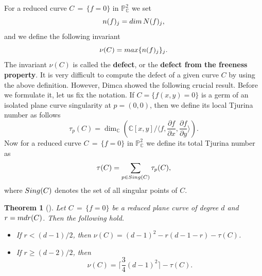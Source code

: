 \documentclass[12pt]{article}
\theoremstyle{plain}
\newtheorem{theorem}[thm]{Theorem}
\theoremstyle{definition}
\begin{document}
For a reduced curve $C \, = \, \{ f=0 \}$ in $\mathbb{P}^{2}_{\mathbb{C}}$ we set 
$$n(f)_{j} = {\rm dim} \, N(f)_{j},$$ and we define the following invariant
$$\nu(C) = {\rm max}\{n(f)_{j}\}_{j}.$$
The invariant $\nu(C)$ is called the \textbf{defect}, or the \textbf{defect from the freeness property}. It is very difficult to compute the defect of a given curve $C$ by using the above definition. However, Dimca showed the following crucial result. Before we formulate it, let us fix the notation. If $C=\{f(x,y)=0\}$ is a germ of an isolated plane curve singularity at $p=(0,0)$, then we define its local Tjurina number as follows 
$$\tau_{p}(C)=\dim_\mathbb{C}\left(\mathbb{C}[x,y] /\bigg\langle f,\frac{\partial f}{\partial x},\frac{\partial f}{\partial y}\bigg\rangle \right).$$  
Now for a reduced curve $C \, = \, \{ f=0 \}$ in $\mathbb{P}^{2}_{\mathbb{C}}$ we define its total Tjurina number as
$$\tau(C) = \sum_{p \in {\rm Sing}(C)} \tau_{p}(C),$$
where ${\rm Sing}(C)$ denotes the set of all singular points of $C$.
\begin{theorem}[{\cite[Theorem 1.2]{Dimca1}}]
\label{deff}
Let $C \, = \, \{ f=0 \}$ be a reduced plane curve of degree $d$ and $r= {\rm mdr}(C)$. Then the following hold.
\begin{itemize}
    \item If $r < (d-1)/2$, then $\nu(C) = (d-1)^{2}-r(d-1-r)-\tau(C)$.
    \item If $r \geq (d-2)/2$, then
    $$\nu(C) = \bigg\lceil\frac{3}{4}(d-1)^{2}\bigg\rceil - \tau(C).$$
\end{itemize}
\end{theorem}
\end{document}
